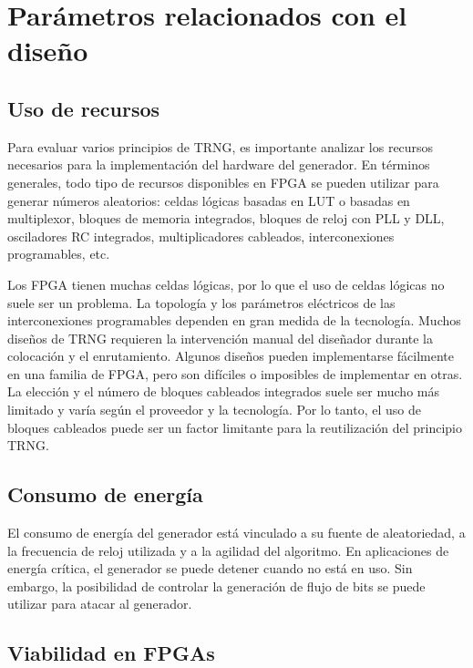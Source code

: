 	\section{Parámetros relacionados con el diseño}	
		
	\subsection{Uso de recursos}
				
	Para evaluar varios principios de TRNG, es importante analizar los recursos necesarios para la implementación del hardware del generador. En términos generales, todo tipo de recursos disponibles en FPGA se pueden utilizar para generar números aleatorios: celdas lógicas basadas en LUT o basadas en multiplexor, bloques de memoria integrados, bloques de reloj con PLL y DLL, osciladores RC integrados, multiplicadores cableados, interconexiones programables, etc.
					
	Los FPGA tienen muchas celdas lógicas, por lo que el uso de celdas lógicas  no suele ser un problema. La topología y los parámetros eléctricos de las interconexiones programables dependen en gran medida de la tecnología. Muchos diseños de TRNG requieren la intervención manual del diseñador durante la colocación y el enrutamiento. Algunos diseños pueden implementarse fácilmente en una familia de FPGA, pero son difíciles o imposibles de implementar en otras. La elección y el número de bloques cableados integrados suele ser mucho más limitado y varía según el proveedor y la tecnología. Por lo tanto, el uso de bloques cableados puede ser un factor limitante para la reutilización del principio TRNG.
				
	\subsection{Consumo de energía}
					
	El consumo de energía del generador está vinculado a su fuente de aleatoriedad, a la frecuencia de reloj utilizada y a la agilidad del algoritmo. En aplicaciones de energía crítica, el generador se puede detener cuando no está en uso. Sin embargo, la posibilidad de controlar la generación de flujo de bits se puede utilizar para atacar al generador.
					
	\subsection{Viabilidad en FPGAs}
				
